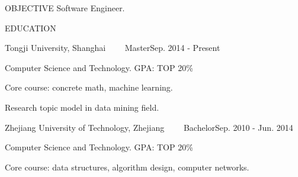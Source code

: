 \documentclass{resume} %
\begin{document}
\begin{rSection}{OBJECTIVE}
Software Engineer.
\end{rSection}


\begin{rSection}{EDUCATION}

\begin{rSubSubsection}{Tongji University, Shanghai \ \ \ \ Master}{Sep. 2014 - Present}
\item Computer Science and Technology. GPA: TOP 20\%
\item Core course: concrete math, machine learning.
\item Research topic model in data mining field.
\end{rSubSubsection}

\begin{rSubSubsection}{Zhejiang University of Technology, Zhejiang \ \ \ \ Bachelor}{Sep. 2010 - Jun. 2014}
\item Computer Science and Technology. GPA: TOP 20\%
\item Core course: data structures,  algorithm design, computer networks.
\end{rSubSubsection}

\end{rSection}

\end{document}
